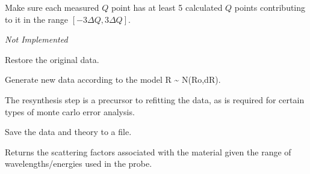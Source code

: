 \documentclass[letterpaper,10pt,english]{sphinxmanual}
\begin{document}
\begin{fulllineitems}

\begin{fulllineitems}
\label{api/probe:refl1d.probe.Probe.resolution_guard}
Make sure each measured $Q$ point has at least 5 calculated $Q$
points contributing to it in the range $[-3\Delta Q,3\Delta Q]$.

\emph{Not Implemented}

\end{fulllineitems}


\begin{fulllineitems}
\label{api/probe:refl1d.probe.Probe.restore_data}
Restore the original data.

\end{fulllineitems}


\begin{fulllineitems}
\label{api/probe:refl1d.probe.Probe.resynth_data}
Generate new data according to the model R \textasciitilde{} N(Ro,dR).

The resynthesis step is a precursor to refitting the data, as is
required for certain types of monte carlo error analysis.

\end{fulllineitems}


\begin{fulllineitems}
\label{api/probe:refl1d.probe.Probe.save}
Save the data and theory to a file.

\end{fulllineitems}


\begin{fulllineitems}
\label{api/probe:refl1d.probe.Probe.scattering_factors}
Returns the scattering factors associated with the material given
the range of wavelengths/energies used in the probe.


\end{fulllineitems}
\end{fulllineitems}
\end{document}
